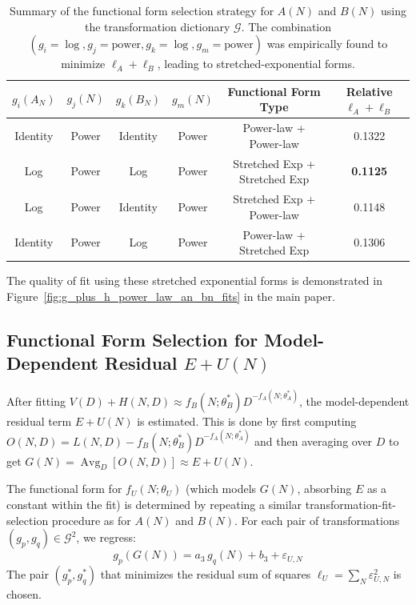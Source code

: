 \documentclass{article}
\begin{document}
\begin{table}[!htbp]
\centering
\caption{Summary of the functional form selection strategy for $A(N)$ and $B(N)$ using the transformation dictionary $\mathcal{G}$. The combination $(g_i=\log, g_j=\text{power}, g_k=\log, g_m=\text{power})$ was empirically found to minimize $\ell_A+\ell_B$, leading to stretched-exponential forms.}
\label{tab:an_bn_transform_selection}
\begin{tabular}{cccccc}
\toprule
$g_i(A_N)$ & $g_j(N)$ & $g_k(B_N)$ & $g_m(N)$ & Functional Form Type & Relative $\ell_A+\ell_B$ \\
\midrule
Identity   & Power    & Identity   & Power    & Power-law + Power-law       & 0.1322     \\
Log        & Power    & Log        & Power    & Stretched Exp + Stretched Exp & \textbf{0.1125} \\
Log        & Power    & Identity   & Power    & Stretched Exp + Power-law      & 0.1148     \\
Identity   & Power    & Log        & Power    & Power-law + Stretched Exp & 0.1306 \\
\bottomrule
\end{tabular}
\end{table}
The quality of fit using these stretched exponential forms is demonstrated in Figure~\ref{fig:g_plus_h_power_law_an_bn_fits} in the main paper.

\subsection{Functional Form Selection for Model-Dependent Residual $E+U(N)$}
\label{app:u_form_selection}

After fitting $V(D)+H(N,D) \approx f_B(N;\theta_B^*)D^{-f_A(N;\theta_A^*)}$, the model-dependent residual term $E+U(N)$ is estimated. This is done by first computing $O(N,D) = L(N,D) - f_B(N;\theta_B^*)D^{-f_A(N;\theta_A^*)}$ and then averaging over $D$ to get $G(N) = \operatorname*{Avg}_{D}[O(N,D)] \approx E+U(N)$.

The functional form for $f_U(N;\theta_U)$ (which models $G(N)$, absorbing $E$ as a constant within the fit) is determined by repeating a similar transformation-fit-selection procedure as for $A(N)$ and $B(N)$. For each pair of transformations $(g_p, g_q) \in \mathcal{G}^2$, we regress:
\begin{equation}
  g_p(G(N)) = a_3\,g_q(N) + b_3 + \varepsilon_{U,N}
\end{equation}
The pair $(g_p^*, g_q^*)$ that minimizes the residual sum of squares $\ell_U = \sum_N \varepsilon_{U,N}^2$ is chosen.
\end{document}
